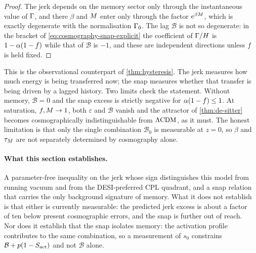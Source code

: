 \begin{proof}
  The jerk depends on the memory sector only through the instantaneous value of
  $\Gamma$, and there $\beta$ and $M$ enter only through the factor
  $e^{\beta M}$, which is exactly degenerate with the normalisation
  $\Gamma_{0}$. The lag $\mathcal B$ is not so degenerate: in the bracket of
  \cref{eq:cosmography-snap-explicit} the coefficient of $\Gamma/H$ is
  $1-\alpha(1-f)$ while that of $\mathcal B$ is $-1$, and these are
  independent directions unless $f$ is held fixed.
\end{proof}

This is the observational counterpart of \cref{thm:hysteresis}. The jerk
measures how much energy is being transferred now; the snap measures whether
that transfer is being driven by a lagged history. Two limits check the
statement. Without memory, $\mathcal B=0$ and the snap excess is strictly
negative for $\alpha(1-f)\le1$. At saturation, $f,M\to1$, both
$\varepsilon$ and $\mathcal B$ vanish and the \dS attractor of
\cref{thm:de-sitter} becomes cosmographically indistinguishable from $\Lambda\mathrm{CDM}$,
as it must. The honest limitation is that only the single combination
$\mathcal B_0$ is measurable at $z=0$, so $\beta$ and $\tau_{M}$ are not separately
determined by cosmography alone.

\paragraph{What this section establishes.}
A parameter-free inequality on the jerk whose sign distinguishes this model
from running vacuum and from the DESI-preferred CPL quadrant, and a snap
relation that carries the only background signature of memory. What it does not
establish is that either is currently measurable: the predicted jerk excess is
about a factor of ten below present cosmographic errors, and the snap is
further out of reach. Nor does it establish that the snap isolates memory: the
activation profile contributes to the same combination, so a measurement of
$s_0$ constrains $\mathcal B+p(1-S_{\mathrm{act}})$ and not $\mathcal B$ alone.
